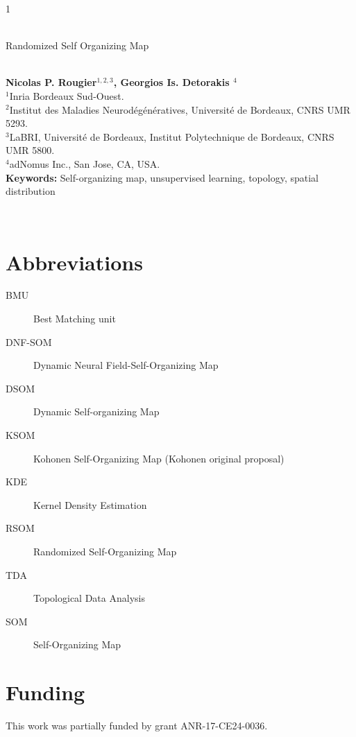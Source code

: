 

\linenumbers





\hspace{13.9cm}1

\ \vspace{20mm}\\

{\LARGE Randomized Self Organizing Map}

\ \\
{\bf \large Nicolas P. Rougier$^{\displaystyle 1, \displaystyle 2, \displaystyle 3}$, Georgios Is. Detorakis $^{\displaystyle 4}$}\\
{$^{\displaystyle 1}$Inria Bordeaux Sud-Ouest.}\\
{$^{\displaystyle 2}$Institut des Maladies Neurodégénératives, Université  de Bordeaux, CNRS UMR 5293.}\\
{$^{\displaystyle 3}$LaBRI, Université de Bordeaux, Institut Polytechnique de Bordeaux, CNRS UMR 5800.}\\
{$^{\displaystyle 4}$adNomus Inc., San Jose, CA, USA.}\\
%

{\bf Keywords:} Self-organizing map, unsupervised learning, topology, spatial distribution 

\thispagestyle{empty}
%
\ \vspace{-0mm}\\
%
\begin{center} {\bf } \end{center}







\section*{Abbreviations}
\begin{description}
    \item[BMU]     Best Matching unit
    \item[DNF-SOM] Dynamic Neural Field-Self-Organizing Map
    \item[DSOM]    Dynamic Self-organizing Map
    \item[KSOM]    Kohonen Self-Organizing Map (Kohonen original proposal)
    \item[KDE]     Kernel Density Estimation
    \item[RSOM]    Randomized Self-Organizing Map
    \item[TDA]     Topological Data Analysis
    \item[SOM]     Self-Organizing Map
\end{description}

\section*{Funding}
This work was partially funded by grant ANR-17-CE24-0036.






\newpage
\appendix



